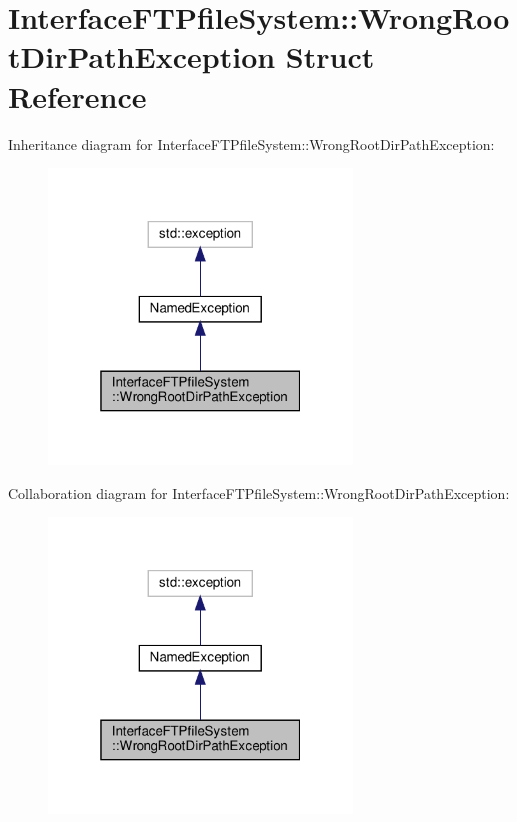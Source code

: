 \hypertarget{structInterfaceFTPfileSystem_1_1WrongRootDirPathException}{}\section{Interface\+F\+T\+Pfile\+System\+:\+:Wrong\+Root\+Dir\+Path\+Exception Struct Reference}
\label{structInterfaceFTPfileSystem_1_1WrongRootDirPathException}


Inheritance diagram for Interface\+F\+T\+Pfile\+System\+:\+:Wrong\+Root\+Dir\+Path\+Exception\+:\nopagebreak
\begin{figure}[H]
\begin{center}
\leavevmode
\includegraphics[width=229pt]{d9/df2/structInterfaceFTPfileSystem_1_1WrongRootDirPathException__inherit__graph}
\end{center}
\end{figure}


Collaboration diagram for Interface\+F\+T\+Pfile\+System\+:\+:Wrong\+Root\+Dir\+Path\+Exception\+:\nopagebreak
\begin{figure}[H]
\begin{center}
\leavevmode
\includegraphics[width=229pt]{d6/dd0/structInterfaceFTPfileSystem_1_1WrongRootDirPathException__coll__graph}
\end{center}
\end{figure}
